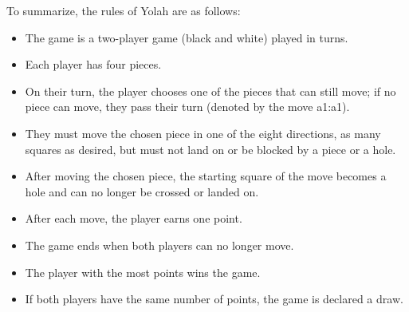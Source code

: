\documentclass[12pt,a4paper,twoside,openright]{book}
\begin{document}
To summarize, the rules of Yolah are as follows:
\begin{itemize}
\item The game is a two-player game (black and white) played in turns.
\item Each player has four pieces.
\item On their turn, the player chooses one of the pieces that can still move; if no piece can move, they pass their turn (denoted by the move {\ttfamily a1:a1}).
\item They must move the chosen piece in one of the eight directions, as many squares as desired, but must not land on or be blocked by a piece or a hole.
\item After moving the chosen piece, the starting square of the move becomes a hole and can no longer be crossed or landed on.
\item After each move, the player earns one point.
\item The game ends when both players can no longer move.
\item The player with the most points wins the game.
\item If both players have the same number of points, the game is declared a draw.
\end{itemize}
\end{document}
